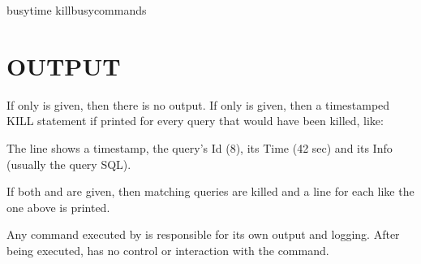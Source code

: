\documentclass[letterpaper,10pt,english]{sphinxmanual}
\begin{document}
\begin{sphinxVerbatim}[commandchars=\\\{\}]
\PYGZhy{}\PYGZhy{}busy\PYGZhy{}time  \PYGZhy{}\PYGZhy{}kill\PYGZhy{}busy\PYGZhy{}commands 
\end{sphinxVerbatim}


\section{OUTPUT}
\label{\detokenize{mariadb-kill:output}}
If only {\hyperref[\detokenize{mariadb-kill:cmdoption-mariadb-kill-kill}]{}} is given, then there is no output.  If only
{\hyperref[\detokenize{mariadb-kill:cmdoption-mariadb-kill-print}]{}} is given, then a timestamped KILL statement if printed
for every query that would have been killed, like:

\begin{sphinxVerbatim}[commandchars=\\\{\}]
\end{sphinxVerbatim}

The line shows a timestamp, the query’s Id (8), its Time (42 sec) and its
Info (usually the query SQL).

If both {\hyperref[\detokenize{mariadb-kill:cmdoption-mariadb-kill-kill}]{}} and {\hyperref[\detokenize{mariadb-kill:cmdoption-mariadb-kill-print}]{}} are given, then matching queries are
killed and a line for each like the one above is printed.

Any command executed by {\hyperref[\detokenize{mariadb-kill:cmdoption-mariadb-kill-execute-command}]{}} is responsible for its own
output and logging.  After being executed,  has no control or interaction
with the command.
\end{document}
